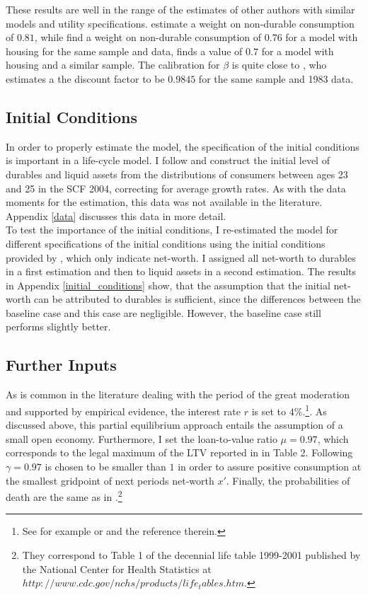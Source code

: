 \documentclass[a4paper,12pt,legno]{article}
\begin{document}
These results are well in the range of the estimates of other authors with similar models and utility specifications. \cite{FV&K2011} estimate a weight on non-durable consumption of $0.81$, while \cite{hintermaier2016} find a weight on non-durable consumption of $0.76$ for a model with housing for the same sample and data, \cite{gruber2003precautionary} finds a value of $0.7$ for a model with housing and a similar sample.
The calibration for $\beta$ is quite close to \cite{hintermaier2011}, who estimates a the discount factor to be $0.9845$ for the same sample and 1983 data. 

\subsection{Initial Conditions}
In order to properly estimate the model, the specification of the initial conditions is important in a life-cycle model. I follow \cite{hintermaier2011} and construct the initial level of durables and liquid assets from the distributions of consumers between ages 23 and 25 in the SCF 2004, correcting for average growth rates. As with the data moments for the estimation, this data was not available in the literature. Appendix \ref{data} discusses this data in more detail. \\
To test the importance of the initial conditions, I re-estimated the model for different specifications of the initial conditions using the initial conditions provided by \cite{hintermaier2011}, which only indicate net-worth. I assigned all net-worth to durables in a first estimation and then to liquid assets in a second estimation. The results in Appendix \ref{initial_conditions} show, that the assumption that the initial net-worth can be attributed to durables is sufficient, since the differences between the baseline case and this case are negligible. However, the baseline case still performs slightly better. 

\subsection{Further Inputs}

As is common in the literature dealing with the period of the great moderation and supported by empirical evidence, the interest rate $r$ is set to $4\%$.\footnote{See for example \citep{FV&K2011} or \cite{hintermaier2011} and the reference therein.}. As discussed above, this partial equilibrium approach entails the assumption of a small open economy. Furthermore, I set the loan-to-value ratio $\mu = 0.97$, which corresponds to the legal maximum of the LTV reported in \cite{green2005american} in Table 2. Following \cite{hintermaier2010} $\gamma = 0.97$ is chosen to be smaller than $1$ in order to assure positive consumption at the smallest gridpoint of next periods net-worth $x'$. Finally, the probabilities of death are the same as in \cite{hintermaier2011}.\footnote{They correspond to Table 1 of the decennial life table 1999-2001 published by the National Center for Health Statistics at $http://www.cdc.gov/nchs/products/life_tables.htm$.} 
\end{document}

